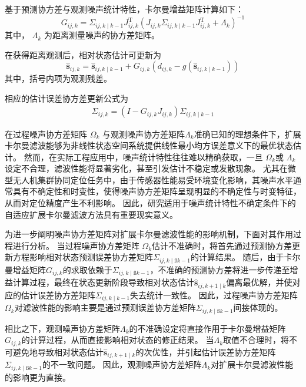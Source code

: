 基于预测协方差与观测噪声统计特性，卡尔曼增益矩阵计算如下：
\begin{equation}
G_{i j, k}=\Sigma_{i j, k \mid k-1} J_{i j, k}^{\mathrm{T}}\left(J_{i j, k} \Sigma_{i j, k \mid k-1} J_{i j, k}^{\mathrm{T}}+\Lambda_{k}\right)^{-1}
\end{equation}
其中， $\Lambda_{k}$  为距离测量噪声的协方差矩阵。

在获得距离观测后，相对状态估计可更新为
\begin{equation}
\hat{\mathbf{s}}_{i j, k}=\hat{\mathbf{s}}_{i j, k \mid k-1}+G_{i j, k}\left(d_{i j, k}-g\left(\hat{\mathbf{s}}_{i j, k \mid k-1}\right)\right)
\end{equation}
其中，括号内项为观测残差。

相应的估计误差协方差更新公式为 
\begin{equation}
\begin{array}{l}

\Sigma_{i j, k}=\left(I-G_{i j, k} J_{i j, k}\right) \Sigma_{i j, k \mid k-1}
\end{array}
\end{equation}

在过程噪声协方差矩阵 $\Omega_{k}$ 与观测噪声协方差矩阵$\Lambda_{k}$​ 准确已知的理想条件下，扩展卡尔曼滤波能够为非线性状态空间系统提供线性最小均方误差意义下的最优状态估计。
然而，在实际工程应用中，噪声统计特性往往难以精确获取，一旦 $\Omega_{k}$​ 或 $\Lambda_{k}$ ​ 设定不合理，滤波性能将显著劣化，甚至引发估计不稳定或发散现象。
尤其在微型无人机集群协同定位任务中，由于传感器性能易受环境变化影响，其噪声水平通常具有不确定性和时变性，使得噪声协方差矩阵呈现明显的不确定性与时变特征，从而对定位精度产生不利影响。
因此，研究适用于噪声统计特性不确定条件下的自适应扩展卡尔曼滤波方法具有重要现实意义。 

为进一步阐明噪声协方差矩阵对扩展卡尔曼滤波性能的影响机制，下面对其作用过程进行分析。
当过程噪声协方差矩阵 $\Omega_{k}$​估计不准确时，将首先通过预测协方差更新方程影响相对状态预测误差协方差矩阵$\Sigma_{i j, k\mid ßk−1​}$​的计算结果。
随后，由于卡尔曼增益矩阵$G_{i j, k}$​的求取依赖于$\Sigma_{i j, k\mid ßk−1​}$​，不准确的预测协方差将进一步传递至增益计算过程，最终在状态更新阶段导致相对状态估计$\hat{\mathbf{s}}_{i j, k+1 \mid k}$​偏离最优解，并使对应的估计误差协方差矩阵$\Sigma_{i j, k\mid k−1​}$​失去统计一致性。
因此，过程噪声协方差矩阵$\Omega_{k}$​对滤波性能的影响主要是通过预测误差协方差矩阵$\Sigma_{i j, k\mid ßk−1​}$​间接体现的。

相比之下，观测噪声协方差矩阵$\Lambda_{k}$​ ​的不准确设定将直接作用于卡尔曼增益矩阵$G_{i j, k}$​的计算过程，从而直接影响相对状态的修正结果。
当$\Lambda_{k}$​ ​取值不合理时，将不可避免地导致相对状态估计$\hat{\mathbf{s}}_{i j, k+1 \mid k}$的次优性，并引起估计误差协方差矩阵$\Sigma_{i j, k\mid ßk−1​}$​的不一致问题。
因此，观测噪声协方差矩阵$\Lambda_{k}$​ ​对扩展卡尔曼滤波性能的影响更为直接。


